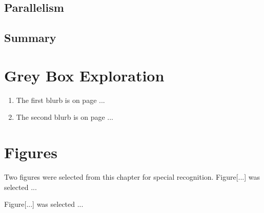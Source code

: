\documentclass[12pt]{article}
\begin{document}
\subsection{Parallelism}

\subsection{Summary}

\section{Grey Box Exploration}

\begin{enumerate}
  \item The first blurb is on page ...

  \item The second blurb is on page ...
\end{enumerate}

\section{Figures}

Two figures were selected from this chapter for special recognition. Figure[...] was selected ...


Figure[...] was selected ...

\end{document}
